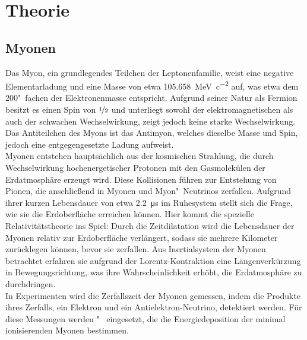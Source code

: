 \documentclass[12pt,a4paper,ngerman]{report}
\begin{document}

\chapter{Theorie}
	\section{Myonen}
	Das Myon, ein grundlegendes Teilchen der Leptonenfamilie, weist eine negative Elementarladung und eine Masse von etwa \qty{105.658}{\mega\electronvolt\per c\squared} auf, was etwa dem 200"~fachen der Elektronenmasse entspricht.
    Aufgrund seiner Natur als Fermion besitzt es einen Spin von $\nicefrac{1}{2}$ und unterliegt sowohl der elektromagnetischen als auch der schwachen Wechselwirkung, zeigt jedoch keine starke Wechselwirkung. Das Antiteilchen des Myons ist das Antimyon, welches dieselbe Masse und Spin, jedoch eine entgegengesetzte Ladung aufweist. \\

	Myonen entstehen hauptsächlich aus der kosmischen Strahlung, die durch Wechselwirkung hochenergetischer Protonen mit den Gasmolekülen der Erdatmosphäre erzeugt wird. Diese Kollisionen führen zur Entstehung von Pionen, die anschließend in Myonen und Myon"~Neutrinos zerfallen.
    Aufgrund ihrer kurzen Lebensdauer von etwa \qty{2.2}{\micro\second} im Ruhesystem stellt sich die Frage, wie sie die Erdoberfläche erreichen können. Hier kommt die spezielle Relativitätstheorie ins Spiel: Durch die Zeitdilatation wird die Lebensdauer der Myonen relativ zur Erdoberfläche verlängert, sodass sie mehrere Kilometer zurücklegen können, bevor sie zerfallen.   
    Aus Inertialsystem der Myonen betrachtet erfahren sie aufgrund der Lorentz-Kontraktion eine Längenverkürzung in Bewegungsrichtung, was ihre Wahrscheinlichkeit erhöht, die Erdatmosphäre zu durchdringen. \\
	
	In Experimenten wird die Zerfallszeit der Myonen gemessen, indem die Produkte ihres Zerfalls, ein Elektron und ein Antielektron-Neutrino, detektiert werden. Für diese Messungen werden "~ eingesetzt, die die Energiedeposition der minimal ionisierenden Myonen bestimmen. 
\end{document}
